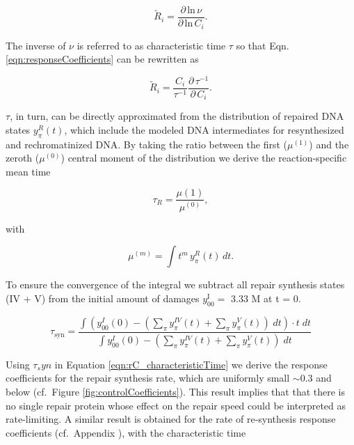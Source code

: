 \begin{equation}
\tilde{R}_i = \frac{\partial \, \text{ln} \, \nu}{\partial \, \text{ln} \, C_i}.
\label{eqn:responseCoefficients}
\end{equation}

The inverse of $\nu$ is referred to as characteristic time $\tau$ so that Eqn. \ref{eqn:responseCoefficients} can be rewritten as

\begin{equation}
\tilde{R}_i = \frac{C_i}{\tau^{-1}} \frac{\partial  \, \tau^{-1}}{\partial \,  C_i}.
\label{eqn:rC_characteristicTime}   
\end{equation}

$\tau$, in turn, can be directly approximated from the distribution of repaired DNA states $y^R_\pi(t)$, which include the modeled DNA intermediates for resynthesized and rechromatinized DNA. By taking the ratio between the first ($\mu^{(1)}$) and the zeroth ($\mu^{(0)}$) central moment of the distribution we derive the reaction-specific mean time 

\begin{equation}
\tau_{R} = \frac{\mu{(1)}}{\mu^{(0)}}, 
\label{eqn:meanreactiontime}   
\end{equation}

with

\begin{equation}
\mu^{(m)} = \int t^m \, y^R_\pi(t)\, dt.
\label{eqn:moments}   
\end{equation}


To ensure the convergence of the integral we subtract all repair synthesis states (IV + V) from the initial amount of damages $y^{\text{I}}_{00} = $ 3.33 \textmu M at t = 0.
	
\begin{equation}	
	\tau_{\text{syn}}=\frac{\int (y^I_{00}(0)-( \sum_ \pi  y_\pi^{IV}(t)+\sum_ \pi  y_\pi^{V}(t))\; dt)\cdot t\; dt}{\int y^I_{00}(0)-( \sum_ \pi  y_\pi^{IV}(t)+\sum_ \pi  y_\pi^{V}(t))\; dt}
\end{equation}

Using $\tau_syn$ in Equation \ref{eqn:rC_characteristicTime} we derive the response coefficients for the repair synthesis rate, which are uniformly small $\sim$0.3 and below (cf.\ Figure \ref{fig:controlCoefficients}). This result implies that that there is no single repair protein whose effect on the repair speed could be interpreted as rate-limiting. A similar result is obtained for the rate of re-synthesis response coefficients (cf.\ Appendix ), with the characteristic time

